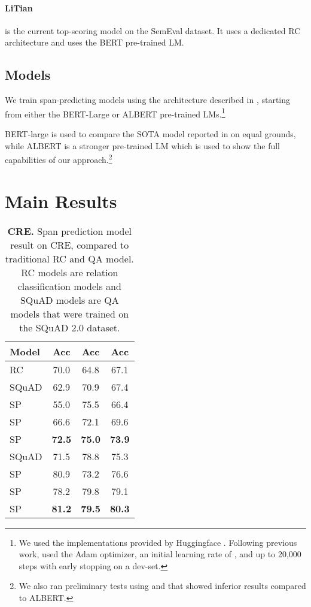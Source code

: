 \documentclass[11pt]{article}
\begin{document}
\paragraph{LiTian} \cite{Li2020} is the current top-scoring model on the SemEval dataset. It uses a dedicated RC architecture and uses the BERT pre-trained LM. 

\subsection{Models}
We train span-predicting models using the architecture described in \cite{Devlin2018}, starting from either the BERT-Large \cite{Devlin2018} or ALBERT \cite{Lan2019} pre-trained LMs.\footnote{We used the implementations provided by Huggingface \cite{Wolf2019}. Following previous work, used the Adam optimizer, an initial learning rate of , and up to 20,000 steps with early stopping on a dev-set.}

BERT-large is used to compare the SOTA model reported in \cite{Soares2019} on equal grounds, while ALBERT is a stronger pre-trained LM which is used to show the full capabilities of our approach.\footnote{We also ran preliminary tests using \cite{Liu2019} and \cite{Joshi2019} that showed inferior results compared to ALBERT.}


\section{Main Results}

\begin{table}[t]
\centering
\begin{tabular}{l c c c}
\toprule
Model  & Acc & Acc & Acc \\
\midrule
\midrule
RC & 70.0 & 64.8 & 67.1 \\
SQuAD & 62.9 & 70.9 & 67.4 \\
SP & 55.0 & 75.5 & 66.4 \\
SP & 66.6 & 72.1 & 69.6 \\
SP & {\bf 72.5} & {\bf 75.0} & {\bf 73.9} \\
\midrule
\midrule
SQuAD & 71.5 & 78.8 & 75.3 \\
SP & 80.9 & 73.2 & 76.6 \\
SP & 78.2 & 79.8 & 79.1 \\
SP & {\bf 81.2} & {\bf 79.5} & {\bf 80.3} \\
\bottomrule
\end{tabular} \caption{{\bf CRE.} Span prediction model result on CRE, compared to traditional RC and QA model. RC models are relation classification models and SQuAD models are QA models that were trained on the SQuAD 2.0 dataset.}
\label{tab:challange}
\end{table}
\end{document}
